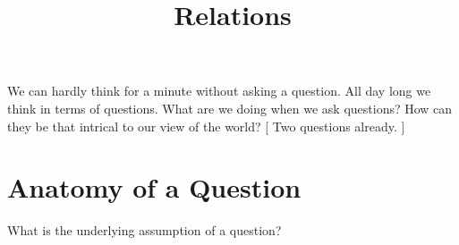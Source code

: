 \documentclass{ximera}
\title{Relations}
\begin{document}
\begin{abstract}

\end{abstract}
\maketitle




We can hardly think for a minute without asking a question.  All day long we think in terms of questions. What are we doing when we ask questions? How can they be that intrical to our view of the world? [ Two questions already. ] \\




\section{Anatomy of a Question}


What is the underlying assumption of a question?
\end{document}
